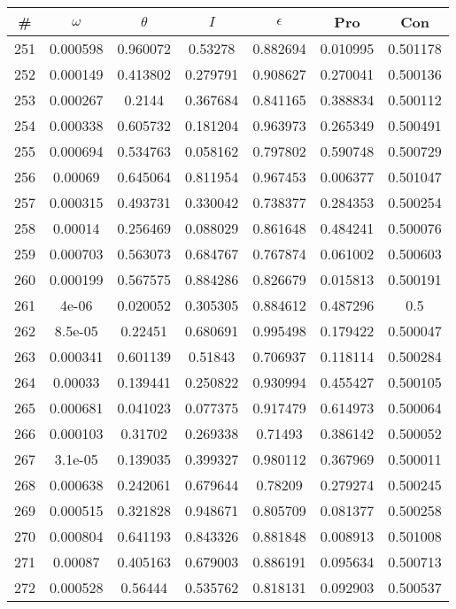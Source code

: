 \newpage
\begin{table}
\begin{tabular}{c|c|c|c|c|c|c}
\# & $\omega$ & $\theta$ & $I$ & $\epsilon$ & Pro & Con\\
\hline
251 & 0.000598 & 0.960072 & 0.53278 & 0.882694 & 0.010995 & 0.501178\\
252 & 0.000149 & 0.413802 & 0.279791 & 0.908627 & 0.270041 & 0.500136\\
253 & 0.000267 & 0.2144 & 0.367684 & 0.841165 & 0.388834 & 0.500112\\
254 & 0.000338 & 0.605732 & 0.181204 & 0.963973 & 0.265349 & 0.500491\\
255 & 0.000694 & 0.534763 & 0.058162 & 0.797802 & 0.590748 & 0.500729\\
256 & 0.00069 & 0.645064 & 0.811954 & 0.967453 & 0.006377 & 0.501047\\
257 & 0.000315 & 0.493731 & 0.330042 & 0.738377 & 0.284353 & 0.500254\\
258 & 0.00014 & 0.256469 & 0.088029 & 0.861648 & 0.484241 & 0.500076\\
259 & 0.000703 & 0.563073 & 0.684767 & 0.767874 & 0.061002 & 0.500603\\
260 & 0.000199 & 0.567575 & 0.884286 & 0.826679 & 0.015813 & 0.500191\\
261 & 4e-06 & 0.020052 & 0.305305 & 0.884612 & 0.487296 & 0.5\\
262 & 8.5e-05 & 0.22451 & 0.680691 & 0.995498 & 0.179422 & 0.500047\\
263 & 0.000341 & 0.601139 & 0.51843 & 0.706937 & 0.118114 & 0.500284\\
264 & 0.00033 & 0.139441 & 0.250822 & 0.930994 & 0.455427 & 0.500105\\
265 & 0.000681 & 0.041023 & 0.077375 & 0.917479 & 0.614973 & 0.500064\\
266 & 0.000103 & 0.31702 & 0.269338 & 0.71493 & 0.386142 & 0.500052\\
267 & 3.1e-05 & 0.139035 & 0.399327 & 0.980112 & 0.367969 & 0.500011\\
268 & 0.000638 & 0.242061 & 0.679644 & 0.78209 & 0.279274 & 0.500245\\
269 & 0.000515 & 0.321828 & 0.948671 & 0.805709 & 0.081377 & 0.500258\\
270 & 0.000804 & 0.641193 & 0.843326 & 0.881848 & 0.008913 & 0.501008\\
271 & 0.00087 & 0.405163 & 0.679003 & 0.886191 & 0.095634 & 0.500713\\
272 & 0.000528 & 0.56444 & 0.535762 & 0.818131 & 0.092903 & 0.500537\\

\end{tabular}
\end{table}
